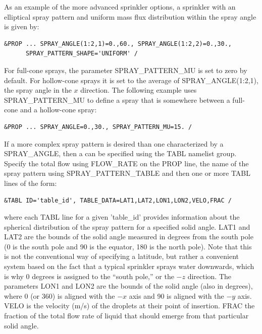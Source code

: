 \documentclass[11pt]{book}
\begin{document}
As an example of the more advanced sprinkler options, a sprinkler with an elliptical spray pattern and uniform mass flux distribution within the spray angle is given by:
\begin{lstlisting}
&PROP ... SPRAY_ANGLE(1:2,1)=0.,60., SPRAY_ANGLE(1:2,2)=0.,30.,
      SPRAY_PATTERN_SHAPE='UNIFORM' /
\end{lstlisting}
For full-cone sprays, the parameter {\ct SPRAY\_PATTERN\_MU} is set to zero by default. For hollow-cone sprays it is set to the average of {\ct SPRAY\_ANGLE(1:2,1)}, the spray angle in the $x$ direction. The following example uses  {\ct SPRAY\_PATTERN\_MU} to define a spray that is somewhere between a full-cone and a hollow-cone spray:
\begin{lstlisting}
&PROP ... SPRAY_ANGLE=0.,30., SPRAY_PATTERN_MU=15. /
\end{lstlisting}
If a more complex spray pattern is desired than one characterized by a {\ct SPRAY\_ANGLE}, then a  can be specified using the {\ct TABL} namelist group. Specify the total flow using {\ct FLOW\_RATE} on the {\ct PROP} line, the name of the spray pattern using {\ct SPRAY\_PATTERN\_TABLE} and then one or more {\ct TABL} lines of the form:
\begin{lstlisting}
&TABL ID='table_id', TABLE_DATA=LAT1,LAT2,LON1,LON2,VELO,FRAC /
\end{lstlisting}
where each {\ct TABL} line for a given {\ct 'table\_id'} provides information about the spherical distribution of the spray pattern for a specified solid angle. {\ct LAT1} and {\ct LAT2} are the bounds of the solid angle measured in degrees from the south pole (0 is the south pole and 90 is the equator, 180 is the north pole).  Note that this is not the conventional way of specifying a latitude, but rather a convenient system based on the fact that a typical sprinkler sprays water downwards, which is why 0 degrees is assigned to the ``south pole,'' or the $-z$ direction. The parameters {\ct LON1} and {\ct LON2} are the bounds of the solid angle (also in degrees), where 0 (or 360) is aligned with the $-x$ axis and 90 is aligned with the $-y$ axis.  {\ct VELO} is the velocity (m/s) of the droplets at their point of insertion. {\ct FRAC} the fraction of the total flow rate of liquid that should emerge from that particular solid angle.
\end{document}
